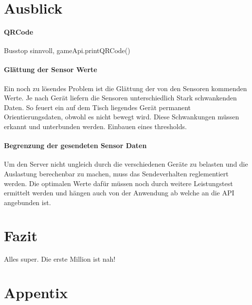 \documentclass[a4paper]{spie}  %
\begin{document}
\section{Ausblick}

\paragraph{QRCode} %
    Busstop sinnvoll, gameApi.printQRCode()
\paragraph{Glättung der Sensor Werte}  %
Ein noch zu lösendes Problem ist die Glättung der von den Sensoren kommenden Werte. Je nach Gerät liefern die Sensoren unterschiedlich Stark schwankenden Daten. So feuert ein auf dem Tisch liegendes Gerät permanent Orientierungsdaten, obwohl es nicht bewegt wird. Diese Schwankungen müssen erkannt und unterbunden werden. Einbauen eines thresholds.

\paragraph{Begrenzung der gesendeten Sensor Daten} %
Um den Server nicht ungleich durch die verschiedenen Geräte zu belasten und die Auslastung berechenbar zu machen, muss das Sendeverhalten reglementiert werden. Die optimalen Werte dafür müssen noch durch weitere Leistungstest ermittelt werden und hängen auch von der Anwendung ab welche an die API angebunden ist.


\section{Fazit} %
Alles super. Die erste Million ist nah!




 \renewcommand{\bibname}{Referenzen}

\nocite{}

\newpage

\section{Appentix}
\appendix
\end{document}
